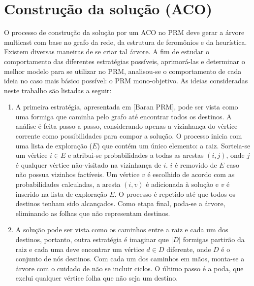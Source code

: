 \section{Construção da solução (ACO)}

O processo de construção da solução por um ACO no PRM deve gerar a árvore multicast com base no grafo da rede, da estrutura de feromônios e da heurística. Existem diversas maneiras de se criar tal árvore. A fim de estudar o comportamento das diferentes estratégias possíveis, aprimorá-las e determinar o melhor modelo para se utilizar no PRM, analisou-se o comportamento de cada ideia no caso mais básico possível: o PRM mono-objetivo. As ideias consideradas neste trabalho são listadas a seguir:

\begin{enumerate}
	\item A primeira estratégia, apresentada em [Baran PRM], pode ser vista como uma formiga que caminha pelo grafo até encontrar todos os destinos. A análise é feita passo a passo, considerando apenas a vizinhança do vértice corrente como possibilidades para compor a solução. O processo inicia com uma lista de exploração ($E$) que contém um único elemento: a raiz. Sorteia-se um vértice $i \in E$ e atribui-se probabilidades a todas as arestas $(i, j)$, onde $j$ é qualquer vértice não-visitado na vizinhança de $i$. $i$ é removido de $E$ caso não possua vizinhos factíveis. Um vértice $v$ é escolhido de acordo com as probabilidades calculadas, a aresta $(i, v)$ é adicionada à solução e $v$ é inserido na lista de exploração $E$. O processo é repetido até que todos os destinos tenham sido alcançados. Como etapa final, poda-se a árvore, eliminando as folhas que não representam destinos.
	\item A solução pode ser vista como os caminhos entre a raiz e cada um dos destinos, portanto, outra estratégia é imaginar que $|D|$ formigas partirão da raiz e cada uma deve encontrar um vértice $d \in D$ diferente, onde $D$ é o conjunto de nós destinos. Com cada um dos caminhos em mãos, monta-se a árvore com o cuidado de não se incluir ciclos. O último passo é a poda, que exclui qualquer vértice folha que não seja um destino. %

\end{enumerate}
